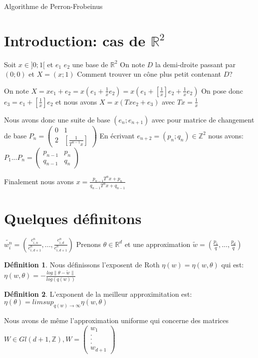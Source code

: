 \documentclass[12pt]{article}
\theoremstyle{plain}%
\theoremstyle{definition}
\newtheorem{dfnt}{Définition}[section]
\theoremstyle{remark}
\begin{document}
Algorithme de Perron-Frobeinus

\section{Introduction: cas de $\mathbb{R}^{2}$}

Soit $x \in ]0;1[$ et $e_1$ $e_2$ une base de $\mathbb{R}^2$
On note $D$ la demi-droite passant par $(0;0)$ et $X=(x;1)$
Comment trouver un cône plus petit contenant $D$?

On note $X=xe_1+e_2=x(e_1+\frac{1}{x}e_2)=x(e_1+[\frac{1}{x}]e_2+{\frac{1}{x}}e_2)$
On pose donc $e_3=e_1+[\frac{1}{x}]e_2$ et nous avons $X=x(Txe_2+e_3)$ avec $Tx={\frac{1}{x}}$

Nous avons donc une suite de base $(e_n;e_{n+1})$ avec pour matrice de changement de base $P_n=
\begin{pmatrix}
   0 & 1 \\
   2 & [\frac{1}{T^{n-1}x}]
\end{pmatrix}$
En écrivant $e_{n+2}=(p_n;q_n)\in \mathbb{Z}^2$ nous avons:
$P_1...P_n=
\begin{pmatrix}
  p_{n-1} & p_n \\
  q_{n-1} & q_n
\end{pmatrix}$

Finalement nous avons $x=\frac{p_{n-1}T^n {x}+p_n}{q_{n-1}T^n x+q_{n-1}}$
\section{Quelques définitons}

$\tilde{w_i^n}=(\frac{c_{i,n}^n}{c^n_{i,d+1}},...,\frac{c^n_{i,d}}{c^n_{i,d+1}})$
Prenons $\theta \in \mathbb{R}^d$ et une approximation $\tilde{w}=(\frac{p_1}{q},...,\frac{p_d}{q})$
\begin{dfnt}
  Nous définissons l'exposent de Roth $\eta (w)=\eta(w,\theta)$ qui est:
  $\eta(w,\theta)=-\frac{log\| \theta - \tilde{w} \|}{log(q(w))}$
\end{dfnt}
\begin{dfnt}
  L'exponent de la meilleur approximitation est:
  $\eta(\theta)=limsup_{q(w) \to \infty} \eta(w,\theta)$
\end{dfnt}
Nous avons de même l'approximation uniforme qui concerne des matrices $W \in Gl(d+1,\mathbb{Z}), W=\begin{pmatrix}
w_1\\
. \\
. \\
. \\
w_{d+1}
\end{pmatrix}$
\end{document}
